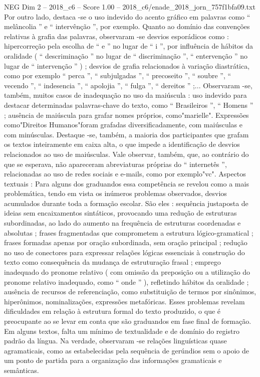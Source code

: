 \begin{textsample}{NEG Dim 2 – 2018\_c6 – Score 1.00 – 2018\_c6/enade\_2018\_jorn\_757f1bfa09.txt}
Por outro lado, destaca -se o uso indevido do acento gráfico em palavras como “ melâncolia ” e “ intervênção ”, por exemplo.
Quanto ao domínio das convenções relativas à grafia das palavras, observaram -se desvios esporádicos como : hipercorreção pela escolha de “ e ” no lugar de “ i ”, por influência de hábitos da oralidade ( “ descriminação ” no lugar de “ discriminação ”, “ entervenção ” no lugar de “ intervenção ” ) ; desvios de grafia relacionados à variação diastrática, como por exemplo “ perca ”, “ subjulgadas ”, “ precoseito ”, “ soubre ”, “ vecendo ”, “ indesencia ”, “ apolojia ”, “ fulga ”, “ dereitos ” ;...
Observaram -se, também, muitos casos de inadequação no uso da maiúscula : uso indevido para destacar determinadas palavras-chave do texto, como “ Brasileiros ”, “ Homens ” ; ausência de maiúscula para grafar nomes próprios, como"marielle".
Expressões como"Direitos Humanos"foram grafadas diversificadamente, com maiúsculas e com minúsculas.
Destaque -se, também, a maioria dos participantes que grafam os textos inteiramente em caixa alta, o que impede a identificação de desvios relacionados ao uso de maiúsculas.
Vale observar, também, que, ao contrário do que se esperava, não apareceram abreviaturas próprias do “ internetês ”, relacionadas ao uso de redes sociais e e-mails, como por exemplo"vc".
Aspectos textuais : Para alguns dos graduandos essa competência se revelou como a mais problemática, tendo em vista os inúmeros problemas observados, desvios acumulados durante toda a formação escolar.
São eles : sequência justaposta de ideias sem encaixamentos sintáticos, provocando uma redução de estruturas subordinadas, ao lado do aumento na frequência de estruturas coordenadas e absolutas ; frases fragmentadas que comprometem a estrutura lógico-gramatical ; frases formadas apenas por oração subordinada, sem oração principal ; redução no uso de conectores para expressar relações lógicas essenciais à construção do texto como consequência da mudança de estruturação frasal ; emprego inadequado do pronome relativo ( com omissão da preposição ou a utilização do pronome relativo inadequado, como “ onde ” ), refletindo hábitos da oralidade ; ausência de recursos de referenciação, como substituição de termos por sinônimos, hiperônimos, nominalizações, expressões metafóricas.
Esses problemas revelam dificuldades em relação à estrutura formal do texto produzido, o que é preocupante ao se levar em conta que são graduandos em fase final de formação.
Em alguns textos, falta um mínimo de textualidade e de domínio do registro padrão da língua.
Na verdade, observaram -se relações linguísticas quase agramaticais, como as estabelecidas pela sequência de gerúndios sem o apoio de um ponto de partida para a organização das informações gramaticais e semânticas.

\end{textsample}
